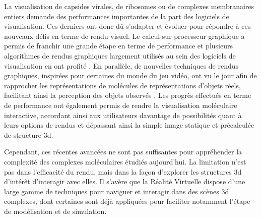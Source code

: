 La visualisation de capsides virales, de ribosomes ou de complexes membranaires entiers demande des performances importantes de la part des logiciels de visualisation. Ces derniers ont donc dû s'adapter et évoluer pour répondre à ces nouveaux défis en terme de rendu visuel. Le calcul sur processeur graphique a permis de franchir une grande étape en terme de performance et plusieurs algorithmes de rendus graphiques largement utilisés au sein des logiciels de visualisation en ont profité \cite{chavent_gpu-powered_2011}. En parallèle, de nouvelles techniques de rendus graphiques, inspirées pour certaines du monde du jeu vidéo, ont vu le jour afin de rapprocher les représentations de molécules de représentations d'objets réels, facilitant ainsi la perception des objets observés \cite{lv_game_2013}. Les progrès effectués en terme de performance ont également permis de rendre la visualisation moléculaire interactive,  accordant ainsi aux utilisateurs davantage de possibilités quant à leurs options de rendus et dépassant ainsi la simple image statique et précalculée de structure 3d.

Cependant, ces récentes avancées ne sont pas suffisantes pour appréhender la complexité des complexes moléculaires étudiés aujourd'hui. La limitation n'est pas dans l'efficacité du rendu, mais dans la façon d'explorer les structures 3d d'intérêt d'interagir avec elles. Il s'avère que la Réalité Virtuelle dispose d'une large gamme de techniques pour naviguer et interagir dans des scènes 3d complexes, dont certaines sont déjà appliquées pour faciliter notamment l'étape de modélisation et de simulation.

\clearpage



